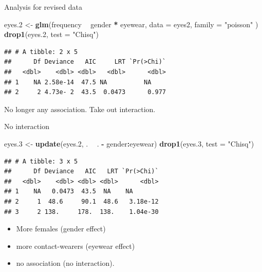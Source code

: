 \documentclass[
  ignorenonframetext,
]{beamer}
\newenvironment{Shaded}{\begin{snugshade}}{\end{snugshade}}
\newcommand{\DataTypeTok}[1]{\textcolor[rgb]{0.13,0.29,0.53}{#1}}
\newcommand{\FloatTok}[1]{\textcolor[rgb]{0.00,0.00,0.81}{#1}}
\newcommand{\KeywordTok}[1]{\textcolor[rgb]{0.13,0.29,0.53}{\textbf{#1}}}
\newcommand{\NormalTok}[1]{#1}
\newcommand{\OperatorTok}[1]{\textcolor[rgb]{0.81,0.36,0.00}{\textbf{#1}}}
\newcommand{\StringTok}[1]{\textcolor[rgb]{0.31,0.60,0.02}{#1}}
\begin{document}
\begin{frame}[fragile]{Analysis for revised data}
\protect\hypertarget{analysis-for-revised-data}{}

\begin{Shaded}
\begin{Highlighting}[]
\NormalTok{eyes}\FloatTok{.2}\NormalTok{ <-}\StringTok{ }\KeywordTok{glm}\NormalTok{(frequency }\OperatorTok{~}\StringTok{ }\NormalTok{gender }\OperatorTok{*}\StringTok{ }\NormalTok{eyewear,}
  \DataTypeTok{data =}\NormalTok{ eyes2,}
  \DataTypeTok{family =} \StringTok{"poisson"}
\NormalTok{)}
\KeywordTok{drop1}\NormalTok{(eyes}\FloatTok{.2}\NormalTok{, }\DataTypeTok{test =} \StringTok{"Chisq"}\NormalTok{)}
\end{Highlighting}
\end{Shaded}

\begin{verbatim}
## # A tibble: 2 x 5
##      Df Deviance   AIC     LRT `Pr(>Chi)`
##   <dbl>    <dbl> <dbl>   <dbl>      <dbl>
## 1    NA 2.58e-14  47.5 NA          NA    
## 2     2 4.73e- 2  43.5  0.0473      0.977
\end{verbatim}

No longer any association. Take out interaction.

\end{frame}

\begin{frame}[fragile]{No interaction}
\protect\hypertarget{no-interaction}{}

\small

\begin{Shaded}
\begin{Highlighting}[]
\NormalTok{eyes}\FloatTok{.3}\NormalTok{ <-}\StringTok{ }\KeywordTok{update}\NormalTok{(eyes}\FloatTok{.2}\NormalTok{, . }\OperatorTok{~}\StringTok{ }\NormalTok{. }\OperatorTok{-}\StringTok{ }\NormalTok{gender}\OperatorTok{:}\NormalTok{eyewear)}
\KeywordTok{drop1}\NormalTok{(eyes}\FloatTok{.3}\NormalTok{, }\DataTypeTok{test =} \StringTok{"Chisq"}\NormalTok{)}
\end{Highlighting}
\end{Shaded}

\begin{verbatim}
## # A tibble: 3 x 5
##      Df Deviance   AIC   LRT `Pr(>Chi)`
##   <dbl>    <dbl> <dbl> <dbl>      <dbl>
## 1    NA   0.0473  43.5  NA    NA       
## 2     1  48.6     90.1  48.6   3.18e-12
## 3     2 138.     178.  138.    1.04e-30
\end{verbatim}

\normalsize

\begin{itemize}
\item
  More females (gender effect)
\item
  more contact-wearers (eyewear effect)
\item
  no association (no interaction).
\end{itemize}

\end{frame}
\end{document}
